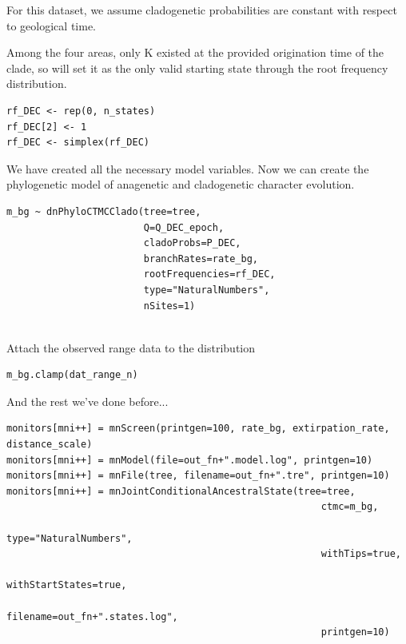 For this dataset, we assume cladogenetic probabilities are constant with respect to geological time.

Among the four areas, only K existed at the provided origination time of the clade, so will set it as the only valid starting state through the root frequency distribution.

\begin{snugshade}
\begin{lstlisting}
rf_DEC <- rep(0, n_states)
rf_DEC[2] <- 1
rf_DEC <- simplex(rf_DEC)
\end{lstlisting}
\end{snugshade}

We have created all the necessary model variables.
Now we can create the phylogenetic model of anagenetic and cladogenetic character evolution.
\begin{snugshade}
\begin{lstlisting}
m_bg ~ dnPhyloCTMCClado(tree=tree,
                        Q=Q_DEC_epoch,
                        cladoProbs=P_DEC,
                        branchRates=rate_bg,
                        rootFrequencies=rf_DEC,
                        type="NaturalNumbers",
                        nSites=1)
                  
\end{lstlisting}
\end{snugshade}

Attach the observed range data to the distribution

\begin{snugshade}
\begin{lstlisting}
m_bg.clamp(dat_range_n)
\end{lstlisting}
\end{snugshade}

And the rest we've done before...

\begin{snugshade}
\begin{lstlisting}
monitors[mni++] = mnScreen(printgen=100, rate_bg, extirpation_rate, distance_scale)
monitors[mni++] = mnModel(file=out_fn+".model.log", printgen=10)
monitors[mni++] = mnFile(tree, filename=out_fn+".tre", printgen=10)
monitors[mni++] = mnJointConditionalAncestralState(tree=tree,
                                                       ctmc=m_bg,
                                                       type="NaturalNumbers",
                                                       withTips=true,
                                                       withStartStates=true,
                                                       filename=out_fn+".states.log",
                                                       printgen=10)
                                                       
\end{lstlisting}
\end{snugshade}

